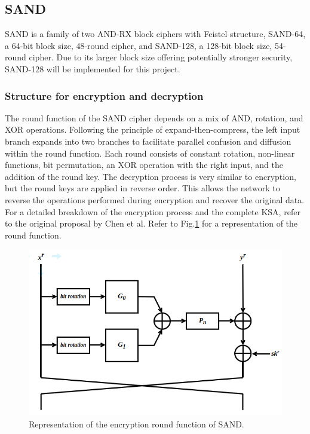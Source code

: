 \documentclass[conference]{IEEEtran}
\begin{document}
\subsection{SAND}
SAND is a family of two AND-RX block ciphers with Feistel structure, SAND-64, a 64-bit block size, 48-round cipher, and SAND-128, a 128-bit block size, 54-round cipher. Due to its larger block size offering potentially stronger security, SAND-128 will be implemented for this project\cite{SAND}.
\subsubsection{Structure for encryption and decryption}
The round function of the SAND cipher depends on a mix of AND, rotation, and XOR operations. Following the principle of expand-then-compress, the left input branch expands into two branches to facilitate parallel confusion and diffusion within the round function. Each round consists of constant rotation, non-linear functions, bit permutation, an XOR operation with the right input, and the addition of the round key. The decryption process is very similar to encryption, but the round keys are applied in reverse order. This allows the network to reverse the operations performed during encryption and recover the original data. For a detailed breakdown of the encryption process and the complete KSA, refer to the original proposal by Chen et al\cite{SAND}. Refer to Fig.\ref{fig:SAND-} for a representation of the round function.

\begin{figure}
    \centering
    \includegraphics[width=0.9\columnwidth]{figures/SAND-ROUND.png}
    \caption{Representation of the encryption round function of SAND.}
    \label{fig:SAND-}
\end{figure}
\end{document}
